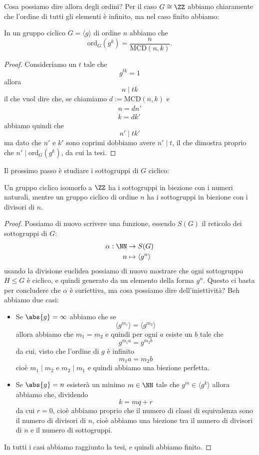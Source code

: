 \documentclass[11pt]{scrartcl}
\newcommand{\ordine}[2]{\text{ord}_{#1}\left(#2\right)}
\newcommand{\MCD}{\text{MCD}}
\begin{document}
	Cosa possiamo dire allora degli ordini? Per il caso $G\cong \ZZ$ abbiamo chiaramente che l'ordine di tutti gli elementi è infinito, ma nel caso finito abbiamo:
	\begin{proposition}
		In un gruppo ciclico $G=\langle g \rangle$ di ordine $n$ abbiamo che
		$$\ordine{G}{g^k}=\frac{n}{\MCD(n,k)}.$$
	\end{proposition}
	\begin{proof}
		Consideriamo un $t$ tale che
		$$g^{tk}=1$$
		allora 
		$$n\mid tk$$
		il che vuol dire che, se chiamiamo $d:= \MCD(n,k)$ e 
		\begin{gather*}
			n=dn' \\
			k=dk'
		\end{gather*}
		abbiamo quindi che 
		$$n'\mid tk'$$
		ma dato che $n'$ e $k'$ sono coprimi dobbiamo avere $n'\mid t$, il che dimostra proprio che $n'\mid \ordine{G}{g^k}$, da cui la tesi.
	\end{proof}
	Il prossimo passo è studiare i sottogruppi di $G$ ciclico:
	\begin{theorem}
		Un gruppo ciclico isomorfo a $\ZZ$ ha i sottogruppi in biezione con i numeri naturali, mentre un gruppo ciclico di ordine $n$ ha i sottogruppi in biezione con i divisori di $n$.
	\end{theorem}
	\begin{proof}
		Possiamo di nuovo scrivere una funzione, essendo $S(G)$ il reticolo dei sottogruppi di $G$:
		\begin{align*}
			\alpha:\NN & \to S(G)\\
			n & \mapsto \langle g^n \rangle
		\end{align*}
		usando la divisione euclidea possiamo di nuovo mostrare che ogni sottogruppo $H\le G$ è ciclico, e quindi generato da un elemento della forma $g^n$. Questo ci basta per concludere che $\alpha$ è suriettiva, ma cosa possiamo dire dell'iniettività? Beh abbiamo due casi:
		\begin{itemize}
			\item Se $\abs{g}=\infty$ abbiamo che se
			$$\langle g^{m_1}\rangle=\langle g^{m_2}\rangle$$
			allora abbiamo che $m_1=m_2$ e quindi per ogni $a$ esiste un $b$ tale che
			$$g^{m_1a}=g^{m_2b}$$ 
			da cui, visto che l'ordine di $g$ è infinito
			$$m_1a=m_2b$$
			cioè $m_1\mid m_2 $ e $m_2\mid m_1$ e quindi abbiamo una biezione perfetta.
			\item Se $\abs{g}=n$ esisterà un minimo $m\in \NN$ tale che $g^m\in \langle g^k\rangle$ allora abbiamo che, dividendo
			$$k=mq+r$$
			da cui $r=0$, cioè abbiamo proprio che il numero di classi di equivalenza sono il numero di divisori di $n$, cioè abbiamo una biezione tra il numero di divisori di $n$ e il numero di sottogruppi.
		\end{itemize}
		In tutti i casi abbiamo raggiunto la tesi, e quindi abbiamo finito.
	\end{proof}
\end{document}
